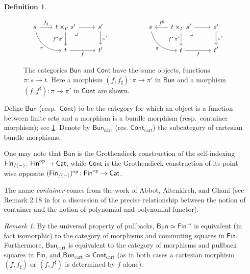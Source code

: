 \documentclass[11pt, article, one side]{memoir}
\theoremstyle{theorem}
\theoremstyle{definition}
\newtheorem{definition}[section]{Definition}
\theoremstyle{remark}
\newtheorem{remark}[section]{Remark}
\newcommand{\Cat}[1]{\mathsf{#1}}%
\newcommand{\op}{^\tn{op}}
\newcommand{\tn}[1]{\textnormal{#1}}
\newcommand{\smcat}{\Cat{Cat}}
\newcommand{\finset}{\Cat{Fin}}
\newcommand{\cont}{\Cat{Cont}}
\newcommand{\bun}{\Cat{Bun}}
\begin{document}
\begin{definition}
\begin{figure}
\[
\begin{tikzcd}
s\ar[dr, bend right=40pt, "\pi"']&[-5pt]
t\times_{t'}s'\ar[r]\ar[d, "f^*\pi'"']\ar[from=l, "f_\sharp"]&
s'\ar[d, "\pi'"]\\&
t\ar[r, "f"']&
t'\ar[ul, phantom, very near end, "\lrcorner"]
\end{tikzcd}
\hspace{.75in}
\begin{tikzcd}
s\ar[dr, bend right=40pt, "\pi"']&[-5pt]
t\times_{t'}s'\ar[r]\ar[d, "f^*\pi'"']\ar[l, "f^\sharp"']&
s'\ar[d, "\pi'"]\\&
t\ar[r, "f"']&
t'\ar[ul, phantom, very near end, "\lrcorner"]
\end{tikzcd}
\]
\caption{The categories $\bun$ and $\cont$ have the same objects, functions $\pi\colon s\to t$. Here a morphism $(f,f_\sharp)\colon \pi\to \pi'$ in $\bun$ and a morphism $(f,f^\sharp)\colon \pi\to\pi'$ in $\cont$ are shown.
}
\label{fig.bund_cont_maps}
\end{figure}
Define $\bun$ (resp.\ $\cont$) to be the category for which an object is a function between finite sets and a morphism is a bundle morphism (resp.\ container morphism); see \cref{fig.bund_cont_maps}. Denote by $\bun_{\text{cart}}$ (res. $\cont_{\text{cart}}$) the subcategory of cartesian bundle morphisms.
\end{definition}

One may note that $\bun$ is the Grothendieck construction of the self-indexing $\finset_{/(-)} \colon \finset\op \to \smcat$, while $\cont$ is the Grothendieck construction of its point-wise opposite $(\finset_{/(-)})\op \colon \finset\op \to \smcat$.

 The name \emph{container} comes from the work of Abbot, Altenkirch, and Ghani \cites{AAG:Containers.In.Proceedings}{AAG:Containers}{A:Containers.Thesis} (see Remark 2.18 in \cite{GK:Polynomial.Functors} for a discussion of the precise relationship between the notion of container and the notion of polynomial and polynomial functor).

\begin{remark}\label{rem.dir_fin2}
By the universal property of pullbacks, $\bun\simeq\finset^{\to}$ is equivalent (in fact isomorphic) to the category of morphisms and commuting squares in $\finset$. Furthermore, $\bun_{\text{cart}}$ is equivalent to the category of morphisms and pullback squares in $\finset$, and $\bun_{\text{cart}} \simeq \cont_{\text{cart}}$ (as in both cases a cartesian morphism $(f, f_{\sharp})$ or $(f, f^{\sharp})$ is determined by $f$ alone).
\end{remark}
\end{document}

